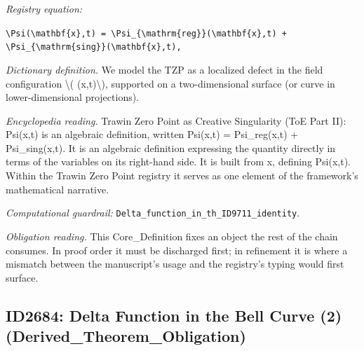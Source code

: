 \documentclass[11pt]{article}
\theoremstyle{remark}
\begin{document}
\noindent\textit{Registry equation:}\par
{\small\texttt{\textbackslash{}Psi(\textbackslash{}mathbf\{x\},t) = \textbackslash{}Psi\_\{\textbackslash{}mathrm\{reg\}\}(\textbackslash{}mathbf\{x\},t) + \textbackslash{}Psi\_\{\textbackslash{}mathrm\{sing\}\}(\textbackslash{}mathbf\{x\},t),}}\par\medskip
\noindent\textit{Dictionary definition.} We model the TZP as a localized defect in the field configuration \textbackslash{}( (x,t)\textbackslash{}), supported on a two-dimensional surface (or curve in lower-dimensional projections).\par\medskip
\noindent\textit{Encyclopedia reading.} Trawin Zero Point as Creative Singularity (ToE Part II): Psi(x,t) is an algebraic definition, written Psi(x,t) = Psi\_reg(x,t) + Psi\_sing(x,t). It is an algebraic definition expressing the quantity directly in terms of the variables on its right-hand side. It is built from x, defining Psi(x,t). Within the Trawin Zero Point registry it serves as one element of the framework's mathematical narrative.
\par\medskip\noindent\textit{Computational guardrail:} \texttt{Delta\_function\_in\_th\_ID9711\_identity}.
\par\medskip\noindent\textit{Obligation reading.} This Core\_Definition fixes an object the rest of the chain consumes. In proof order it must be discharged first; in refinement it is where a mismatch between the manuscript's usage and the registry's typing would first surface.

\subsection{ID2684: Delta Function in the Bell Curve (2) (Derived\_Theorem\_Obligation)}
\end{document}
